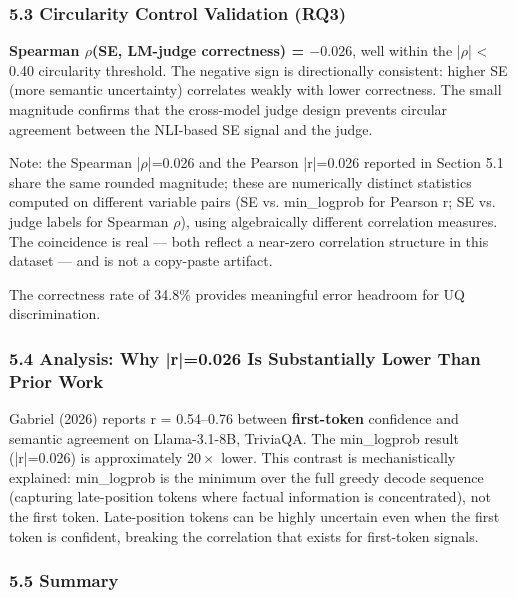 \subsubsection{5.3 Circularity Control Validation (RQ3)}

\textbf{Spearman $\rho$(SE, LM-judge correctness) = $-0.026$}, well within the |$\rho$| < 0.40 circularity threshold. The negative sign is directionally consistent: higher SE (more semantic uncertainty) correlates weakly with lower correctness. The small magnitude confirms that the cross-model judge design prevents circular agreement between the NLI-based SE signal and the judge.

Note: the Spearman |$\rho$|=0.026 and the Pearson |r|=0.026 reported in Section 5.1 share the same rounded magnitude; these are numerically distinct statistics computed on different variable pairs (SE vs. min\_logprob for Pearson r; SE vs. judge labels for Spearman $\rho$), using algebraically different correlation measures. The coincidence is real --- both reflect a near-zero correlation structure in this dataset --- and is not a copy-paste artifact.

The correctness rate of 34.8\% provides meaningful error headroom for UQ discrimination.

\subsubsection{5.4 Analysis: Why |r|=0.026 Is Substantially Lower Than Prior Work}

Gabriel (2026) reports r = 0.54--0.76 between \textbf{first-token} confidence and semantic agreement on Llama-3.1-8B, TriviaQA. The min\_logprob result (|r|=0.026) is approximately $20\times$ lower. This contrast is mechanistically explained: min\_logprob is the minimum over the full greedy decode sequence (capturing late-position tokens where factual information is concentrated), not the first token. Late-position tokens can be highly uncertain even when the first token is confident, breaking the correlation that exists for first-token signals.

\subsubsection{5.5 Summary}

\begin{table}[htbp]
\centering
{}
\end{table}

